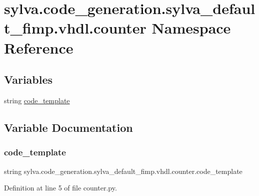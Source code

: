\hypertarget{namespacesylva_1_1code__generation_1_1sylva__default__fimp_1_1vhdl_1_1counter}{}\section{sylva.\+code\+\_\+generation.\+sylva\+\_\+default\+\_\+fimp.\+vhdl.\+counter Namespace Reference}
\label{namespacesylva_1_1code__generation_1_1sylva__default__fimp_1_1vhdl_1_1counter}
\subsection*{Variables}
\begin{DoxyCompactItemize}
\item 
string \hyperlink{namespacesylva_1_1code__generation_1_1sylva__default__fimp_1_1vhdl_1_1counter_a9d13c9bdcdb9b801c32f06372b43b766}{code\+\_\+template}
\end{DoxyCompactItemize}


\subsection{Variable Documentation}
\mbox{\label{namespacesylva_1_1code__generation_1_1sylva__default__fimp_1_1vhdl_1_1counter_a9d13c9bdcdb9b801c32f06372b43b766}} 
\subsubsection{\texorpdfstring{code\+\_\+template}{code\_template}}
{\footnotesize\ttfamily string sylva.\+code\+\_\+generation.\+sylva\+\_\+default\+\_\+fimp.\+vhdl.\+counter.\+code\+\_\+template}



Definition at line 5 of file counter.\+py.

